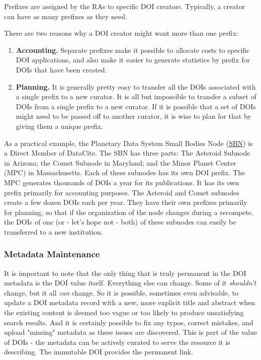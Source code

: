 \documentclass[11pt,a4paper]{ivoa}
\begin{document}
Prefixes are assigned by the RAs to specific DOI creators. Typically, a creator can have as many prefixes as they need.

There are two reasons why a DOI creator might want more than one prefix:

\begin{enumerate}
\item{} \textbf{Accounting.} Separate prefixes make it possible to allocate costs to specific DOI applications, and also make it easier to generate statistics by prefix for DOIs that have been created.
\item{} \textbf{Planning.} It is generally pretty easy to transfer all the DOIs associated with a single prefix to a new curator. It is all but impossible to transfer a subset of DOIs from a single prefix to a new curator. If it is possible that a set of DOIs might need to be passed off to another curator, it is wise to plan for that by giving them a unique prefix.
\end{enumerate}

As a practical example, the Planetary Data System Small Bodies Node (\href{https://pds-smallbodies.astro.umd.edu/}{SBN}) is a Direct Member of DataCite. The SBN has three parts: The Asteroid Subnode in Arizona; the Comet Subnode in Maryland; and the Minor Planet Center (MPC) in Massachusetts. Each of these subnodes has its own DOI prefix. The MPC generates thousands of DOIs a year for its publications. It has its own prefix primarily for accounting purposes. The Asteroid and Comet subnodes create a few dozen DOIs each per year. They have their own prefixes primarily for planning, so that if the organization of the node changes during a recompete, the DOIs of one (or - let's hope not - both) of these subnodes can easily be transferred to a new institution.

\subsubsection{Metadata Maintenance}\hypertarget{metadata-maintenance}{}\label{metadata-maintenance}

It is important to note that the only thing that is truly permanent in the DOI metadata is the DOI value itself. Everything else can change. Some of it \emph{shouldn't} change, but it all \emph{can} change. So it is possible, sometimes even advisable, to update a DOI metadata record with a new, more explicit title and abstract when the existing content is deemed too vague or too likely to produce unsatisfying search results. And it is certainly possible to fix any typos, correct mistakes, and upload "missing" metadata as these issues are discovered. This is part of the value of DOIs - the metadata can be actively curated to serve the resource it is describing. The immutable DOI provides the permanent link.
\end{document}
